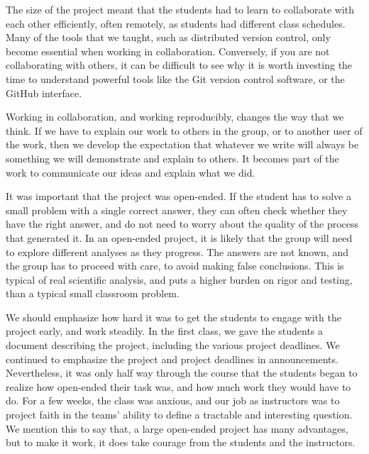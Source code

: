 The size of the project meant that the students had to learn to
collaborate with each other efficiently, often remotely, as students had
different class schedules.  Many of the tools that we taught, such as
distributed version control, only become essential when working in
collaboration.  Conversely, if you are not collaborating with others, it can
be difficult to see why it is worth investing the time to understand powerful
tools like the Git version control software, or the GitHub interface.

Working in collaboration, and working reproducibly, changes the way that we
think.  If we have to explain our work to others in the group, or to
another user of the work, then we develop the expectation that whatever we
write will always be something we will demonstrate and explain to others.  It
becomes part of the work to communicate our ideas and explain what we did.

It was important that the project was open-ended.  If the student has to solve
a small problem with a single correct answer, they can often check
whether they have the right answer, and do not need to worry about the quality
of the process that generated it.  In an open-ended project, it is likely that
the group will need to explore different analyses as they progress.  The
answers are not known, and the group has to proceed with care, to avoid making
false conclusions.  This is typical of real scientific analysis, and puts a
higher burden on rigor and testing, than a typical small classroom problem.

We should emphasize how hard it was to get the students to engage with the
project early, and work steadily.  In the first class, we gave the students a
document describing the project, including the various project deadlines.  We
continued to emphasize the project and project deadlines in announcements.
Nevertheless, it was only half way through the course that the students began
to realize how open-ended their task was, and how much work they would have to
do.  For a few weeks, the class was anxious, and our job as instructors was to
project faith in the teams' ability to define a tractable and interesting
question.  We mention this to say that, a large open-ended project has many
advantages, but to make it work, it does take courage from the students
and the instructors.

